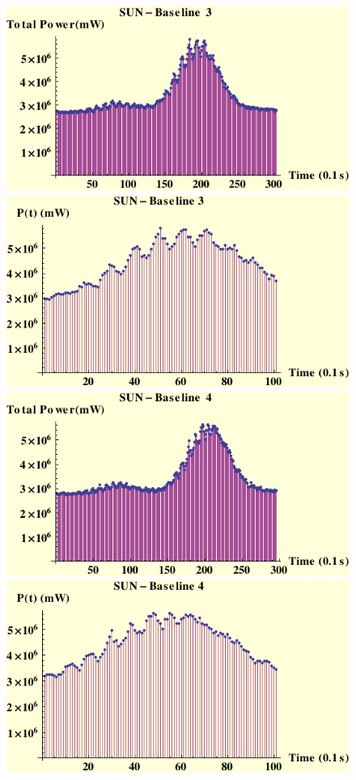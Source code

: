 \begin{figure}[htb]
\begin{center}
 \includegraphics[scale=0.7]{plots/sun3pow.pdf}
 \includegraphics[scale=0.7]{plots/sun3powc.pdf}
 \includegraphics[scale=0.7]{plots/sun4pow.pdf}
 \includegraphics[scale=0.7]{plots/sun4powc.pdf}

\end{center}
\end{figure}
